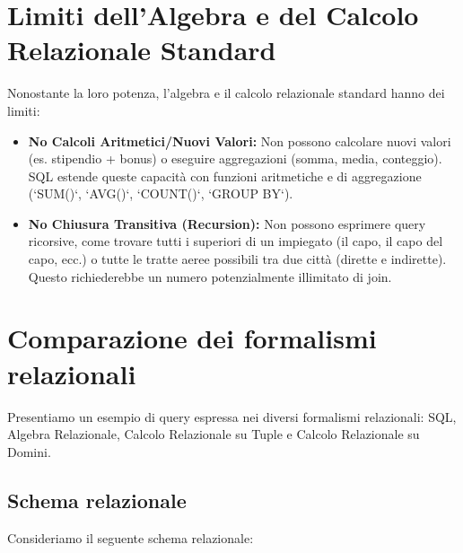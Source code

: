 \section{Limiti dell'Algebra e del Calcolo Relazionale Standard}
Nonostante la loro potenza, l'algebra e il calcolo relazionale standard hanno dei limiti:
\begin{itemize}
	\item \textbf{No Calcoli Aritmetici/Nuovi Valori:} Non possono calcolare nuovi valori (es. stipendio + bonus) o eseguire aggregazioni (somma, media, conteggio). SQL estende queste capacità con funzioni aritmetiche e di aggregazione (`SUM()`, `AVG()`, `COUNT()`, `GROUP BY`).
	\item \textbf{No Chiusura Transitiva (Recursion):} Non possono esprimere query ricorsive, come trovare tutti i superiori di un impiegato (il capo, il capo del capo, ecc.) o tutte le tratte aeree possibili tra due città (dirette e indirette). Questo richiederebbe un numero potenzialmente illimitato di join.
\end{itemize}

\section{Comparazione dei formalismi relazionali}

Presentiamo un esempio di query espressa nei diversi formalismi relazionali: SQL, Algebra Relazionale, Calcolo Relazionale su Tuple e Calcolo Relazionale su Domini.

\subsection{Schema relazionale}
Consideriamo il seguente schema relazionale:

